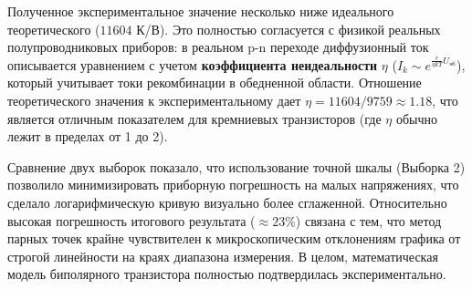 Полученное экспериментальное значение несколько ниже идеального теоретического ($11604$ К/В). Это полностью согласуется с физикой реальных полупроводниковых приборов: в реальном p-n переходе диффузионный ток описывается уравнением с учетом \textbf{коэффициента неидеальности} $\eta$ ($I_k \sim e^{\frac{e}{\eta kT}U_{эб}}$), который учитывает токи рекомбинации в обедненной области. Отношение теоретического значения к экспериментальному дает $\eta = 11604 / 9759 \approx 1.18$, что является отличным показателем для кремниевых транзисторов (где $\eta$ обычно лежит в пределах от 1 до 2). 

Сравнение двух выборок показало, что использование точной шкалы (Выборка 2) позволило минимизировать приборную погрешность на малых напряжениях, что сделало логарифмическую кривую визуально более сглаженной. Относительно высокая погрешность итогового результата ($\approx 23\%$) связана с тем, что метод парных точек крайне чувствителен к микроскопическим отклонениям графика от строгой линейности на краях диапазона измерения. В целом, математическая модель биполярного транзистора полностью подтвердилась экспериментально.